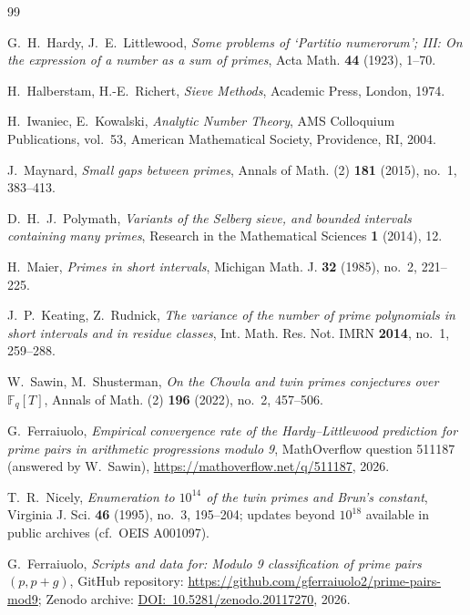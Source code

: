 \documentclass[11pt]{amsart}
\theoremstyle{plain}
\theoremstyle{definition}
\theoremstyle{remark}
\begin{document}
\begin{thebibliography}{99}

G.~H.~Hardy, J.~E.~Littlewood,
\emph{Some problems of `Partitio numerorum'; III: On the expression
of a number as a sum of primes},
Acta Math. \textbf{44} (1923), 1--70.

H.~Halberstam, H.-E.~Richert,
\emph{Sieve Methods},
Academic Press, London, 1974.

H.~Iwaniec, E.~Kowalski,
\emph{Analytic Number Theory},
AMS Colloquium Publications, vol.~53, American Mathematical Society,
Providence, RI, 2004.

J.~Maynard,
\emph{Small gaps between primes},
Annals of Math. (2) \textbf{181} (2015), no.~1, 383--413.

D.~H.~J.~Polymath,
\emph{Variants of the Selberg sieve, and bounded intervals containing
many primes},
Research in the Mathematical Sciences \textbf{1} (2014), 12.

H.~Maier,
\emph{Primes in short intervals},
Michigan Math. J. \textbf{32} (1985), no.~2, 221--225.

J.~P.~Keating, Z.~Rudnick,
\emph{The variance of the number of prime polynomials in short
intervals and in residue classes},
Int. Math. Res. Not. IMRN \textbf{2014}, no.~1, 259--288.

W.~Sawin, M.~Shusterman,
\emph{On the Chowla and twin primes conjectures over $\mathbb{F}_q[T]$},
Annals of Math. (2) \textbf{196} (2022), no.~2, 457--506.

G.~Ferraiuolo,
\emph{Empirical convergence rate of the Hardy--Littlewood prediction
for prime pairs in arithmetic progressions modulo 9},
MathOverflow question 511187 (answered by W.~Sawin),
\url{https://mathoverflow.net/q/511187}, 2026.

T.~R.~Nicely,
\emph{Enumeration to $10^{14}$ of the twin primes and Brun's constant},
Virginia J. Sci. \textbf{46} (1995), no.~3, 195--204; updates beyond
$10^{18}$ available in public archives (cf.\ OEIS A001097).

G.~Ferraiuolo,
\emph{Scripts and data for: Modulo 9 classification of prime pairs $(p, p+g)$},
GitHub repository: \url{https://github.com/gferraiuolo2/prime-pairs-mod9};
Zenodo archive: \href{https://doi.org/10.5281/zenodo.20117270}{DOI:~10.5281/zenodo.20117270},
2026.

\end{thebibliography}
\end{document}
